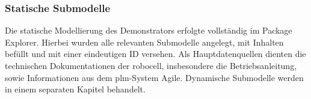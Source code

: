 




\newpage
\subsubsection{Statische Submodelle}
Die statische Modellierung des Demonstrators erfolgte vollständig im Package Explorer.
Hierbei wurden alle relevanten Submodelle angelegt, mit Inhalten befüllt und mit einer eindeutigen ID versehen.
Als Hauptdatenquellen dienten die technischen Dokumentationen der robocell, insbesondere die Betriebsanleitung, sowie Informationen aus dem \acs{plm}-System Agile.
Dynamische Submodelle werden in einem separaten Kapitel behandelt.

